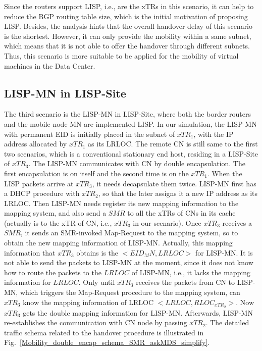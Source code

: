 Since the routers support LISP, i.e., are the xTRs in this scenario, it can help to reduce the BGP routing table size, which is the initial motivation of proposing LISP. Besides, the analysis hints that the overall handover delay of this scenario is the shortest. However, it can only provide the mobility within a same subnet, which means that it is not able to offer the handover through different subnets. Thus, this scenario is more suitable to be applied for the mobility of virtual machines in the Data Center.

\subsection{LISP-MN in LISP-Site}
\label{sec:ns3_analysis_lispmn_xTR}
The third scenario is the LISP-MN in LISP-Site, where both the border routers and the mobile node MN are implemented LISP. In our simulation, the LISP-MN with permanent EID is initially placed in the subnet of $xTR_1$, with the IP address allocated by $xTR_1$ as its LRLOC. The remote CN is still same to the first two scenarios, which is a conventional stationary end host, residing in a LISP-Site of $xTR_3$. The LISP-MN communicates with CN by double encapsulation. The first encapsulation is on itself and the second time is on the $xTR_1$. When the LISP packets arrive at $xTR_3$, it needs decapsulate them twice. %
LISP-MN first has a DHCP procedure with $xTR_2$, so that the later assigns it a new IP address as its LRLOC. Then LISP-MN needs register its new mapping information to the mapping system, and also send a $SMR$ to all the xTRs of CNs in its cache (actually is to the xTR of CN, i.e., $xTR_3$ in our scenario). Once $xTR_3$ receives a $SMR$, it sends an SMR-invoked Map-Request to the mapping system, so to obtain the new mapping information of LISP-MN. Actually, this mapping information that $xTR_3$ obtains is the $<EID_MN, LRLOC>$ for LISP-MN. It is not able to send the packets to LISP-MN at the moment, since it does not know how to route the packets to the $LRLOC$ of LISP-MN, i.e., it lacks the mapping information for $LRLOC$. Only until $xTR_3$ receives the packets from CN to LISP-MN, which triggers the Map-Request procedure to the mapping system, can $xTR_3$ know the mapping information of LRLOC $<LRLOC, RLOC_{xTR_2}>$. Now $xTR_3$ gets the double mapping information for LISP-MN. Afterwards, LISP-MN re-establishes  the communication with CN node by passing $xTR_2$. The detailed traffic schema related to the handover procedure is illustrated in Fig.~\ref{Mobility_double_encap_schema_SMR_askMDS_simplify}.

